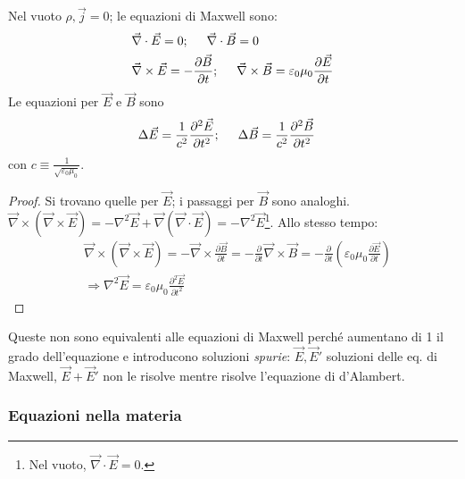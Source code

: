 \documentclass[10pt, a4paper]{scrartcl}
\numberwithin{equation}{subsection}
\theoremstyle{style1}
\newenvironment{boxenv}[1][]{
    \begin{eqbox}[#1]
    }{
   \end{eqbox}
}
\begin{document}
Nel vuoto $\rho , \vec{j}=0$; le equazioni di Maxwell sono:
\begin{equation}
	\begin{split}
		& \vec{\nabla }\cdot \vec{E}=0; \hspace{.5cm} \vec{\nabla }\cdot \vec{B}=0\\
		&\vec{\nabla }\times \vec{E}=-\frac{\partial \vec{B}}{\partial t} ;\hspace{.5cm} \vec{\nabla }\times \vec{B}=\varepsilon _0 \mu_0 \frac{\partial \vec{E}}{\partial t} 
	\end{split}
\end{equation}
Le equazioni per $\vec{E}$ e $\vec{B}$ sono 
\begin{equation}
	\begin{split}
		&\Delta \vec{E} = \frac{1}{c^2}\frac{\partial ^2 \vec{E}}{\partial t^2}; \hspace{5mm} \Delta \vec{B}=\frac{1}{c^2} \frac{\partial ^2 \vec{B}}{\partial t^2} 
	\end{split}
\end{equation}
con $c\equiv \frac{1}{\sqrt{\varepsilon _0 \mu_0} }$. 
\begin{boxenv}[]
\begin{proof}
	Si trovano quelle per $\vec{E}$; i passaggi per $\vec{B}$ sono analoghi. $\vec{\nabla }\times (\vec{\nabla }\times \vec{E}) = - \nabla ^2 \vec{E} + \vec{\nabla }(\vec{\nabla }\cdot \vec{E})= -\nabla ^2 \vec{E}$\footnote{Nel vuoto, $\vec{\nabla }\cdot \vec{E}=0$.}. Allo stesso tempo:
	\[
		\begin{split}
			&\vec{\nabla }\times (\vec{\nabla }\times \vec{E}) = - \vec{\nabla }\times \frac{\partial \vec{B}}{\partial t} = - \frac{\partial }{\partial t} \vec{\nabla }\times \vec{B}= -\frac{\partial }{\partial t} \left(\varepsilon _0\mu_0\frac{\partial \vec{E}}{\partial t} \right) \\
	&\Rightarrow \nabla ^2 \vec{E}=\varepsilon _0 \mu_0 \frac{\partial ^2\vec{E}}{\partial t^2} 
		\end{split}
	\] 
	
\end{proof}
\end{boxenv}
\noindent Queste non sono equivalenti alle equazioni di Maxwell perch\'e aumentano di 1 il grado dell'equazione e introducono soluzioni \textit{spurie}: $\vec{E}, \vec{E}'$ soluzioni delle eq. di Maxwell, $\vec{E}+\vec{E}'$ non le risolve mentre risolve l'equazione di d'Alambert.


\subsubsection{Equazioni nella materia}
\end{document}
